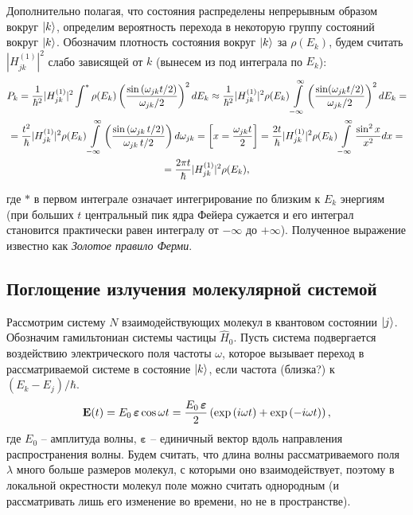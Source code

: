 \documentclass[12pt]{article}
\newcommand{\lb}{\left(}
\newcommand{\rb}{\right)}
\newcommand{\mf}{\mathbf}
\newcommand{\vverh}{\vspace*{-0.15cm}}
\begin{document}
Дополнительно полагая, что состояния распределены непрерывным образом вокруг $\ket{k}$, определим вероятность перехода в некоторую группу состояний вокруг $\ket{k}$. Обозначим плотность состояния вокруг $\ket{k}$ за $\rho (E_k)$, будем считать $|H_{jk}^{(1)}|^2$ слабо зависящей от $k$ (вынесем из под интеграла по $E_k$):
\vverh
\begin{gather}
	P_k = \frac{1}{\hbar^2} |H_{jk}^{(1)} |^2 \int^{*} \rho (E_k) \left( \frac{\sin \lb \omega_{jk} t / 2 \rb}{ \omega_{jk} / 2} \rb ^2 d E_k \approx \frac{1}{\hbar^2} | H_{jk}^{(1)} |^2\rho(E_k) \int\limits_{-\infty}^{\infty} \lb \frac{ \sin( \omega_{jk} t / 2)}{\omega_{jk} / 2} \rb^2 d E_k = \notag \\
		= \frac{t^2}{\hbar} | H_{jk}^{(1)} |^2 \rho(E_k) \int\limits_{-\infty}^{\infty} \lb \frac{\sin \lb \omega_{jk} \, t / 2 \rb}{\omega_{jk} \, t / 2}\rb d \omega_{jk} = \left[ x = \frac{\omega_{jk} t}{2} \right] = \frac{2 t}{\hbar} | H_{jk}^{(1)} |^2 \rho(E_k) \int\limits_{-\infty}^{\infty} \frac{\sin^2 x}{x^2} dx = \notag \\
		= \frac{2 \pi t}{\hbar} | H_{jk}^{(1)} |^2 \rho (E_k), \notag
\end{gather}

где $*$ в первом интеграле означает интегрирование по близким к $E_k$ энергиям (при больших $t$ центральный пик ядра Фейера сужается и его интеграл становится практически равен интегралу от $-\infty$ до $+\infty$). Полученное выражение известно как \textit{Золотое правило Ферми}.    

\subsection*{Поглощение излучения молекулярной системой}

Рассмотрим систему $N$ взаимодействующих молекул в квантовом состоянии $\ket{j}$. Обозначим гамильтониан системы частицы $\hat{H}_0$. Пусть система подвергается воздействию электрического поля частоты $\omega$, которое вызывает переход в рассматриваемой системе в состояние $\ket{k}$, если частота (близка?) к $\lb E_k - E_j \rb / \hbar$. 
\vverh
\begin{gather}
	\mf{E}(t) = E_0 \, \boldsymbol{\varepsilon} \cos \omega t = \frac{E_0 \, \boldsymbol{\varepsilon}}{2} \lb \exp \lb i \omega t \rb + \exp \lb - i \omega t \rb \rb , \notag
\end{gather}
где $E_0$ -- амплитуда волны, $\boldsymbol{\varepsilon}$ -- единичный вектор вдоль направления распространения волны. Будем считать, что длина волны рассматриваемого поля $\lambda$ много больше размеров молекул, с которыми оно взаимодействует, поэтому в локальной окрестности молекул поле можно считать однородным (и рассматривать лишь его изменение во времени, но не в пространстве). 
\end{document}

